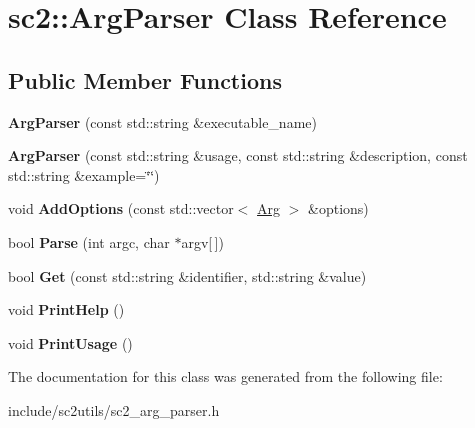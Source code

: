 \hypertarget{classsc2_1_1_arg_parser}{}\section{sc2\+:\+:Arg\+Parser Class Reference}
\label{classsc2_1_1_arg_parser}
\subsection*{Public Member Functions}
\begin{DoxyCompactItemize}
\item 
\mbox{\label{classsc2_1_1_arg_parser_a134a3fa3ddeb9f5218a0530def37164e}} 
{\bfseries Arg\+Parser} (const std\+::string \&executable\+\_\+name)
\item 
\mbox{\label{classsc2_1_1_arg_parser_aea7d752e4e80bbb0a66c8f39f64ae034}} 
{\bfseries Arg\+Parser} (const std\+::string \&usage, const std\+::string \&description, const std\+::string \&example=\char`\"{}\char`\"{})
\item 
\mbox{\label{classsc2_1_1_arg_parser_a1719a8b54007b11fd47b48187b5cbe1a}} 
void {\bfseries Add\+Options} (const std\+::vector$<$ \hyperlink{structsc2_1_1_arg}{Arg} $>$ \&options)
\item 
\mbox{\label{classsc2_1_1_arg_parser_aba7c6ccebaa16fe0407d2174d12786b2}} 
bool {\bfseries Parse} (int argc, char $\ast$argv\mbox{[}$\,$\mbox{]})
\item 
\mbox{\label{classsc2_1_1_arg_parser_ac62cf043d391a622144bf6e92f2dc132}} 
bool {\bfseries Get} (const std\+::string \&identifier, std\+::string \&value)
\item 
\mbox{\label{classsc2_1_1_arg_parser_ae0fc51452403ae3d752e6e2d9ede8c66}} 
void {\bfseries Print\+Help} ()
\item 
\mbox{\label{classsc2_1_1_arg_parser_a8043e051d897635526bf542b96a3235c}} 
void {\bfseries Print\+Usage} ()
\end{DoxyCompactItemize}


The documentation for this class was generated from the following file\+:\begin{DoxyCompactItemize}
\item 
include/sc2utils/sc2\+\_\+arg\+\_\+parser.\+h\end{DoxyCompactItemize}

